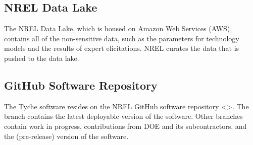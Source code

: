 \documentclass[letterpaper,10pt,english]{sphinxmanual}
\begin{document}
\subsection{NREL Data Lake}
\label{\detokenize{deployment:nrel-data-lake}}
The NREL Data Lake, which is housed on Amazon Web Services (AWS),
contains all of the non-sensitive data, such as the parameters for
technology models and the results of expert elicitations. NREL curates
the data that is pushed to the data lake.


\subsection{GitHub Software Repository}
\label{\detokenize{deployment:github-software-repository}}
The Tyche software resides on the NREL GitHub software repository
\textless{}\textgreater{}. The  branch contains the
latest deployable version of the software. Other branches contain work
in progress, contributions from DOE and its subcontractors, and the
 (pre-release) version of the software.
\end{document}
